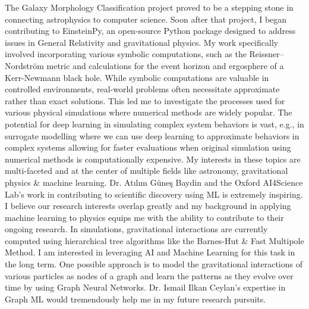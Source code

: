 \documentclass{article}
\begin{document}
  \vspace{5pt}
\hspace{0.25in}The Galaxy Morphology Classification project proved to be a
stepping stone in connecting astrophysics to computer science. Soon after that
project, I began contributing to EinsteinPy, an open-source Python package
designed to address issues in General Relativity and gravitational physics. My
work specifically involved incorporating various symbolic computations, such as
the Reissner–Nordström metric and calculations for the event horizon and
ergosphere of a Kerr-Newmann black hole. While symbolic computations are
valuable in controlled environments, real-world problems often necessitate
approximate rather than exact solutions. This led me to investigate the
processes used for various physical simulations where numerical methods are
widely popular. The potential for deep learning in simulating complex system
behaviors is vast, e.g., in surrogate modelling where we can use deep learning
to approximate behaviors in complex systems allowing for faster evaluations when
original simulation using numerical methods is computationally expensive. My
interests in these topics are multi-faceted and at the center of multiple fields
like astronomy, gravitational physics \& machine learning. Dr. Atılım Güneş
Baydin and the Oxford AI4Science Lab’s work in contributing to scientific
discovery using ML is extremely inspiring. I believe our research interests
overlap greatly and my background in applying machine learning to physics equips
me with the ability to contribute to their ongoing research. In simulations,
gravitational interactions are currently computed using hierarchical tree
algorithms like the Barnes-Hut \& Fast Multipole Method. I am interested in
leveraging AI and Machine Learning for this task in the long term. One possible
approach is to model the gravitational interactions of various particles as
nodes of a graph and learn the patterns as they evolve over time by using Graph
Neural Networks. Dr. Ismail Ilkan Ceylan’s expertise in Graph ML would
tremendously help me in my future research pursuits. 
\end{document}
